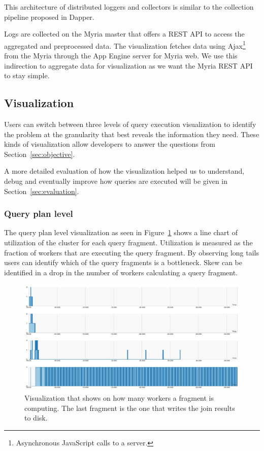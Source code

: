 \documentclass[11pt]{scrartcl}
\begin{document}
This architecture of distributed loggers and collectors is similar to the collection pipeline proposed in Dapper\cite{sigelman2010dapper}.

Logs are collected on the Myria master that offers a REST API to access the aggregated and preprocessed data. The visualization fetches data using Ajax\footnote{Asynchronous JavaScript calls to a server.} from the Myria through the App Engine server for Myria web. We use this indirection to aggregate data for visualization as we want the Myria REST API to stay simple.


\subsection{Visualization}
\label{sec:visualization}

Users can switch between three levels of query execution visualization to identify the problem at the granularity that best reveals the information they need. These kinds of visualization allow developers to answer the questions from Section~\ref{sec:objective}.


A more detailed evaluation of how the visualization helped us to understand, debug and eventually improve how queries are executed will be given in Section~\ref{sec:evaluation}.

\subsubsection{Query plan level}

The query plan level visualization as seen in Figure~\ref{fig:frags} shows a line chart of utilization of the cluster for each query fragment. Utilization is measured as the fraction of workers that are executing the query fragment. By observing long tails users can identify which of the query fragments is a bottleneck. Skew can be identified in a drop in the number of workers calculating a query fragment.

\begin{figure}[h]
  \begin{center}
    \includegraphics[width=\textwidth]{fragments_lines}
  \end{center}
  \caption{Visualization that shows on how many workers a fragment is computing. The last fragment is the one that writes the join results to disk.}
  \label{fig:frags}
\end{figure}
\end{document}
